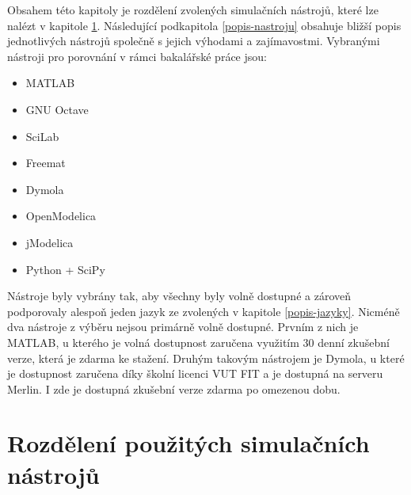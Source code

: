 Obsahem této kapitoly je rozdělení zvolených simulačních nástrojů, které lze nalézt v kapitole \ref{rozdeleni-nastroju}. Následující podkapitola \ref{popis-nastroju} obsahuje bližší popis jednotlivých nástrojů společně s jejich výhodami a zajímavostmi. Vybranými nástroji pro porovnání v rámci bakalářské práce jsou:
\begin{itemize}
    \item MATLAB
    \item GNU Octave
    \item SciLab
    \item Freemat
    \item Dymola
    \item OpenModelica
    \item jModelica
    \item Python + SciPy
\end{itemize}

Nástroje byly vybrány tak, aby všechny byly volně dostupné a zároveň podporovaly alespoň jeden jazyk ze zvolených v kapitole \ref{popis-jazyky}. Nicméně dva nástroje z výběru nejsou primárně volně dostupné. Prvním z nich je MATLAB, u kterého je volná dostupnost zaručena využitím 30 denní zkušební verze, která je zdarma ke stažení. Druhým takovým nástrojem je Dymola, u které je dostupnost zaručena díky školní licenci VUT FIT a je dostupná na serveru Merlin. I zde je dostupná zkušební verze zdarma po omezenou dobu.

\section{Rozdělení použitých simulačních nástrojů}
\label{rozdeleni-nastroju}

